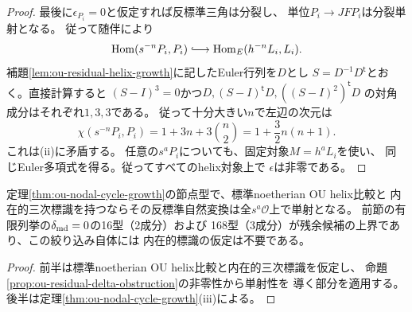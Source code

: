 \begin{proof}
最後に$\epsilon_{P_i}=0$と仮定すれば反標準三角は分裂し、
単位$P_i\to JFP_i$は分裂単射となる。
従って随伴により
\[
 \operatorname{Hom}(s^{-n}P_i,P_i)
 \lhook\joinrel\longrightarrow
 \operatorname{Hom}_E(h^{-n}L_i,L_i).
\]
補題\ref{lem:ou-residual-helix-growth}に記したEuler行列を$D$とし
$S=D^{-1}D^{\mathsf t}$とおく。直接計算すると
$(S-I)^3=0$かつ$D,(S-I)^{\mathsf t}D,((S-I)^2)^{\mathsf t}D$
の対角成分はそれぞれ$1,3,3$である。
従って十分大きい$n$で左辺の次元は
\[
 \chi(s^{-n}P_i,P_i)
 =1+3n+3\binom{n}{2}=1+\frac32 n(n+1).
\]
これは(ii)に矛盾する。
任意の$s^aP_i$についても、固定対象$M=h^aL_i$を使い、
同じEuler多項式を得る。従ってすべてのhelix対象上で
$\epsilon$は非零である。
\end{proof}

\begin{corollary}
\label{cor:ou-nodal-cycle-residual}
定理\ref{thm:ou-nodal-cycle-growth}の節点型で、標準noetherian OU helix比較と
内在的三次標識を持つならその反標準自然変換は全$s^a\mathcal O$上で単射となる。
前節の有限列挙の$\delta_{\rm md}=0$の16型（2成分）および
168型（3成分）が残余候補の上界であり、この絞り込み自体には
内在的標識の仮定は不要である。
\end{corollary}
\begin{proof}
前半は標準noetherian OU helix比較と内在的三次標識を仮定し、
命題\ref{prop:ou-residual-delta-obstruction}の非零性から単射性を
導く部分を適用する。後半は定理\ref{thm:ou-nodal-cycle-growth}(iii)による。
\end{proof}

